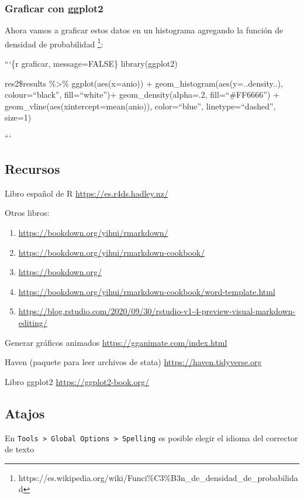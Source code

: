 \hypertarget{graficar-con-ggplot2}{%
\subsubsection{Graficar con ggplot2}\label{graficar-con-ggplot2}}

Ahora vamos a graficar estos datos en un histograma agregando la función
de densidad de probabilidad \footnote{https://es.wikipedia.org/wiki/Funci\%C3\%B3n\_de\_densidad\_de\_probabilidad}:

```\{r graficar, message=FALSE\} library(ggplot2)

res2\$results \%\textgreater\% ggplot(aes(x=anio)) +
geom\_histogram(aes(y=..density..), colour=``black'', fill=``white'')+
geom\_density(alpha=.2, fill=``\#FF6666'') +
geom\_vline(aes(xintercept=mean(anio)), color=``blue'',
linetype=``dashed'', size=1)

```

\hypertarget{recursos}{%
\subsection{Recursos}\label{recursos}}

Libro español de R \url{https://es.r4ds.hadley.nz/}

Otros libros:

\begin{enumerate}
\def\labelenumi{\arabic{enumi})}
\item
  \url{https://bookdown.org/yihui/rmarkdown/}
\item
  \url{https://bookdown.org/yihui/rmarkdown-cookbook/}
\item
  \url{https://bookdown.org/}
\item
  \url{https://bookdown.org/yihui/rmarkdown-cookbook/word-template.html}
\item
  \url{https://blog.rstudio.com/2020/09/30/rstudio-v1-4-preview-visual-markdown-editing/}
\end{enumerate}

Generar gráficos animados \url{https://gganimate.com/index.html}

Haven (paquete para leer archivos de stata)
\url{https://haven.tidyverse.org}

Libro ggplot2 \url{https://ggplot2-book.org/}

\hypertarget{atajos}{%
\subsection{Atajos}\label{atajos}}

En
\texttt{Tools\ \textgreater{}\ Global\ Options\ \textgreater{}\ Spelling}
es posible elegir el idioma del corrector de texto
